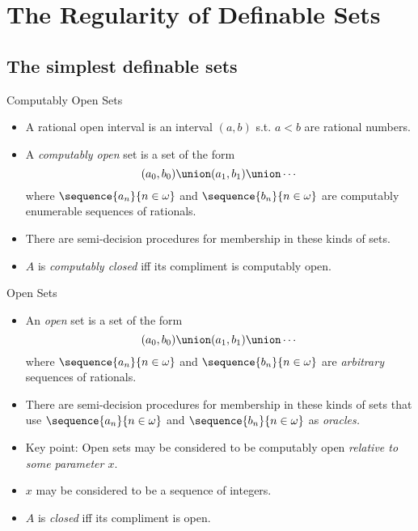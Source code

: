 \documentclass{beamer}
\begin{document}
\section{The Regularity of Definable Sets}

\subsection{The simplest definable sets}

\begin{frame}{Computably Open Sets}

\begin{definition}
\begin{itemize}
  \item A rational open interval is an interval $(a, b)$ s.t.
        $a<b$ are rational numbers.
  \item A \emph{computably open} set is a set of the form
  $$(a_0, b_0) \union (a_1, b_1) \union \cdots$$
  where $\sequence{a_n}{n\in\omega}$ and
  $\sequence{b_n}{n\in\omega}$ are computably enumerable
  sequences of rationals.
  \item There are semi-decision procedures for membership in these kinds
  of sets.
  \item $A$ is \emph{computably closed} iff its compliment is computably open.
\end{itemize}
\end{definition}

\end{frame}

\begin{frame}{Open Sets}

\begin{definition}
\begin{itemize}
  \item An \emph{open} set is a set of the form
  $$(a_0, b_0) \union (a_1, b_1) \union \cdots$$
  where $\sequence{a_n}{n\in\omega}$ and
  $\sequence{b_n}{n\in\omega}$ are \emph{arbitrary} sequences of rationals.
  \item There are semi-decision procedures for membership in these kinds
  of sets that use $\sequence{a_n}{n\in\omega}$ and
  $\sequence{b_n}{n\in\omega}$ as \emph{oracles.}
  \item Key point: Open sets may be considered to be computably open
  \emph{relative to some parameter $x$}.
  \item $x$ may be considered to be a sequence of integers.
  \item $A$ is \emph{closed} iff its compliment is open.
\end{itemize}
\end{definition}

\end{frame}
\end{document}
